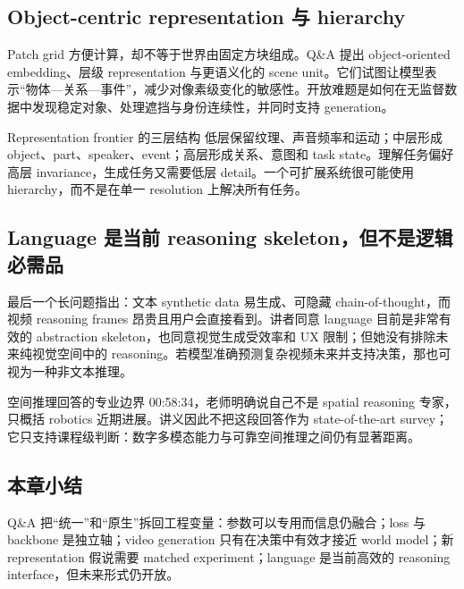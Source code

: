 
\subsection{Object-centric representation 与 hierarchy}

Patch grid 方便计算，却不等于世界由固定方块组成。Q\&A 提出 object-oriented embedding、层级 representation 与更语义化的 scene unit。它们试图让模型表示“物体—关系—事件”，减少对像素级变化的敏感性。开放难题是如何在无监督数据中发现稳定对象、处理遮挡与身份连续性，并同时支持 generation。

\begin{knowledgebox}{Representation frontier 的三层结构}
低层保留纹理、声音频率和运动；中层形成 object、part、speaker、event；高层形成关系、意图和 task state。理解任务偏好高层 invariance，生成任务又需要低层 detail。一个可扩展系统很可能使用 hierarchy，而不是在单一 resolution 上解决所有任务。
\end{knowledgebox}

\subsection{Language 是当前 reasoning skeleton，但不是逻辑必需品}

最后一个长问题指出：文本 synthetic data 易生成、可隐藏 chain-of-thought，而视频 reasoning frames 昂贵且用户会直接看到。讲者同意 language 目前是非常有效的 abstraction skeleton，也同意视觉生成受效率和 UX 限制；但她没有排除未来纯视觉空间中的 reasoning。若模型准确预测复杂视频未来并支持决策，那也可视为一种非文本推理。


\begin{warningbox}{空间推理回答的专业边界}
00:58:34，老师明确说自己不是 spatial reasoning 专家，只概括 robotics 近期进展。讲义因此不把这段回答作为 state-of-the-art survey；它只支持课程级判断：数字多模态能力与可靠空间推理之间仍有显著距离。
\end{warningbox}

\subsection{本章小结}

Q\&A 把“统一”和“原生”拆回工程变量：参数可以专用而信息仍融合；loss 与 backbone 是独立轴；video generation 只有在决策中有效才接近 world model；新 representation 假说需要 matched experiment；language 是当前高效的 reasoning interface，但未来形式仍开放。

